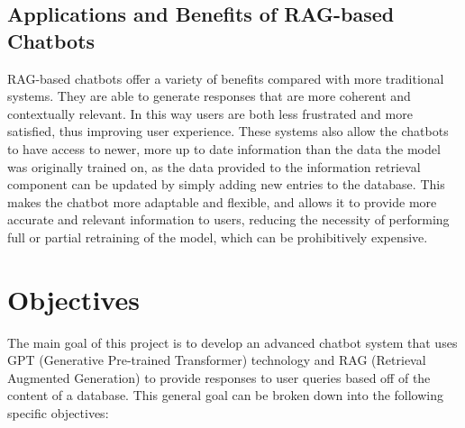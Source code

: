 \documentclass[a4paper,12pt,twoside]{ThesisStyle}
\begin{document}
\section{Applications and Benefits of RAG-based Chatbots}
\label{sec:applications}

RAG-based chatbots offer a variety of benefits compared with more traditional systems. They are able to generate responses that are more coherent and contextually relevant. In this way users are both less frustrated and more satisfied, thus improving user experience. These systems also allow the chatbots to have access to newer, more up to date information than the data the model was originally trained on, as the data provided to the information retrieval component can be updated by simply adding new entries to the database. This makes the chatbot more adaptable and flexible, and allows it to provide more accurate and relevant information to users, reducing the necessity of performing full or partial retraining of the model, which can be prohibitively expensive.

\chapter{Objectives}
\label{cap:objectives}

The main goal of this project is to develop an advanced chatbot system that uses GPT (Generative Pre-trained Transformer) technology and RAG (Retrieval Augmented Generation) to provide responses to user queries based off of the content of a database. This general goal can be broken down into the following specific objectives:
\end{document}
